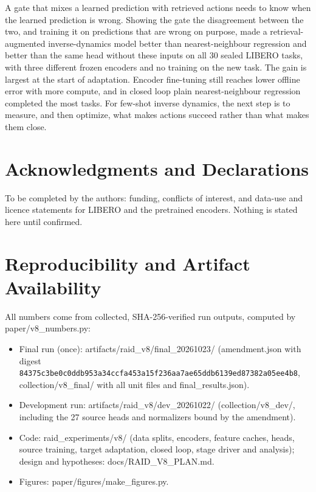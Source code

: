 \documentclass[10pt,twocolumn,letterpaper]{article}
\providecommand{\tightlist}{\setlength{\itemsep}{0pt}\setlength{\parskip}{0pt}}
\begin{document}
A gate that mixes a learned prediction with retrieved actions needs to know when the learned prediction is wrong. Showing the gate the disagreement between the two, and training it on predictions that are wrong on purpose, made a retrieval-augmented inverse-dynamics model better than nearest-neighbour regression and better than the same head without these inputs on all 30 sealed LIBERO tasks, with three different frozen encoders and no training on the new task. The gain is largest at the start of adaptation. Encoder fine-tuning still reaches lower offline error with more compute, and in closed loop plain nearest-neighbour regression completed the most tasks. For few-shot inverse dynamics, the next step is to measure, and then optimize, what makes actions succeed rather than what makes them close.

\section*{Acknowledgments and Declarations}

To be completed by the authors: funding, conflicts of interest, and data-use and licence statements for LIBERO and the pretrained encoders. Nothing is stated here until confirmed.

\section*{Reproducibility and Artifact Availability}\sloppy
{}

All numbers come from collected, SHA-256-verified run outputs, computed by paper/v8\_numbers.py:

\begin{itemize}
\tightlist
\item
  Final run (once): artifacts/raid\_v8/final\_20261023/ (amendment.json with digest \nolinkurl{84375c3be0c0ddb953a34ccfa453a15f236aa7ae65ddb6139ed87382a05ee4b8}, collection/v8\_final/ with all unit files and final\_results.json).
\item
  Development run: artifacts/raid\_v8/dev\_20261022/ (collection/v8\_dev/, including the 27 source heads and normalizers bound by the amendment).
\item
  Code: raid\_experiments/v8/ (data splits, encoders, feature caches, heads, source training, target adaptation, closed loop, stage driver and analysis); design and hypotheses: docs/RAID\_V8\_PLAN.md.
\item
  Figures: paper/figures/make\_figures.py.
\end{itemize}
\end{document}
